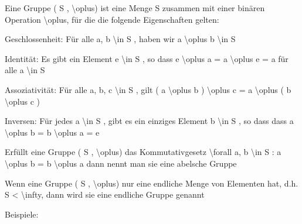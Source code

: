\documentclass[a4paper]{article}
\begin{document}
\begin{multicols}{3}
\begin{itemize*}
            \begin{itemize*}
                  \item Eine Gruppe ( S , \textbackslash oplus) ist eine Menge S zusammen mit einer binären Operation \textbackslash oplus, für die die folgende Eigenschaften gelten:
                  \begin{itemize*} \item Geschlossenheit: Für alle a, b \textbackslash in S , haben wir a \textbackslash oplus b \textbackslash in S \item Identität: Es gibt ein Element e \textbackslash in S , so dass e \textbackslash oplus a = a \textbackslash oplus e = a für alle a \textbackslash in S \item Assoziativität: Für alle a, b, c \textbackslash in S , gilt ( a \textbackslash oplus b ) \textbackslash oplus c = a \textbackslash oplus ( b \textbackslash oplus c ) \item Inversen: Für jedes a \textbackslash in S , gibt es ein einziges Element b \textbackslash in S , so dass dass a \textbackslash oplus b = b \textbackslash oplus a = e \end{itemize*}
                  \item Erfüllt eine Gruppe ( S , \textbackslash oplus) das Kommutativgesetz \textbackslash forall a, b \textbackslash in S : a \textbackslash oplus b = b \textbackslash oplus a dann nennt man sie eine abelsche Gruppe
                  \item Wenn eine Gruppe ( S , \textbackslash oplus) nur eine endliche Menge von Elementen hat, d.h. \textbar S\textbar{} \textless{} \textbackslash infty, dann wird sie eine endliche Gruppe genannt
            \end{itemize*}
            \item
            Beispiele:


\end{itemize*}
\end{multicols}
\end{document}
